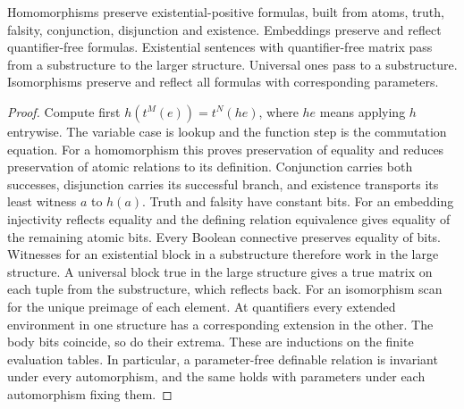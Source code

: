 \begin{theorem}\label{thm:maps}
Homomorphisms preserve existential-positive formulas, built from atoms, truth, falsity, conjunction, disjunction and existence. Embeddings preserve and reflect quantifier-free formulas. Existential sentences with quantifier-free matrix pass from a substructure to the larger structure. Universal ones pass to a substructure. Isomorphisms preserve and reflect all formulas with corresponding parameters.
\end{theorem}
\begin{proof}
Compute first $h(t^M(e))=t^N(h e)$, where $h e$ means applying $h$ entrywise. The variable case is lookup and the function step is the commutation equation. For a homomorphism this proves preservation of equality and reduces preservation of atomic relations to its definition. Conjunction carries both successes, disjunction carries its successful branch, and existence transports its least witness $a$ to $h(a)$. Truth and falsity have constant bits. For an embedding injectivity reflects equality and the defining relation equivalence gives equality of the remaining atomic bits. Every Boolean connective preserves equality of bits. Witnesses for an existential block in a substructure therefore work in the large structure. A universal block true in the large structure gives a true matrix on each tuple from the substructure, which reflects back. For an isomorphism scan for the unique preimage of each element. At quantifiers every extended environment in one structure has a corresponding extension in the other. The body bits coincide, so do their extrema. These are inductions on the finite evaluation tables. In particular, a parameter-free definable relation is invariant under every automorphism, and the same holds with parameters under each automorphism fixing them.
\end{proof}

